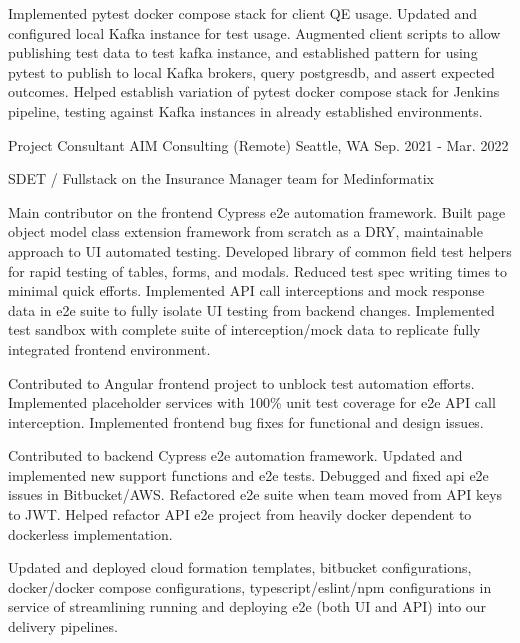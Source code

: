 \begin{cventries}
{\begin{cvitems}
    \item {Implemented pytest docker compose stack for client QE usage. Updated and configured local Kafka instance for test usage. Augmented client scripts to allow publishing test data to test kafka instance, and established pattern for using pytest to publish to local Kafka brokers, query postgresdb, and assert expected outcomes. Helped establish variation of pytest docker compose stack for Jenkins pipeline, testing against Kafka instances in already established environments.}
  \end{cvitems}
}

  \cventry
    {Project Consultant} %
    {AIM Consulting (Remote)} %
    {Seattle, WA} %
    {Sep. 2021 - Mar. 2022} %
    {
      \begin{cvitems} %
        \item[] {SDET / Fullstack on the Insurance Manager team for Medinformatix}
        \item[]
        \item {Main contributor on the frontend Cypress e2e automation framework. Built page object model class extension framework from scratch as a DRY, maintainable approach to UI automated testing. Developed library of common field test helpers for rapid testing of tables, forms, and modals. Reduced test spec writing times to minimal quick efforts. Implemented API call interceptions and mock response data in e2e suite to fully isolate UI testing from backend changes. Implemented test sandbox with complete suite of interception/mock data to replicate fully integrated frontend environment.}
        \item {Contributed to Angular frontend project to unblock test automation efforts. Implemented placeholder services with 100\% unit test coverage for e2e API call interception. Implemented frontend bug fixes for functional and design issues.}
        \item {Contributed to backend Cypress e2e automation framework. Updated and implemented new support functions and e2e tests. Debugged and fixed api e2e issues in Bitbucket/AWS. Refactored e2e suite when team moved from API keys to JWT. Helped refactor API e2e project from heavily docker dependent to dockerless implementation.}
        \item {Updated and deployed cloud formation templates, bitbucket configurations, docker/docker compose configurations, typescript/eslint/npm configurations in service of streamlining running and deploying e2e (both UI and API) into our delivery pipelines.}

\end{cvitems}}
\end{cventries}
